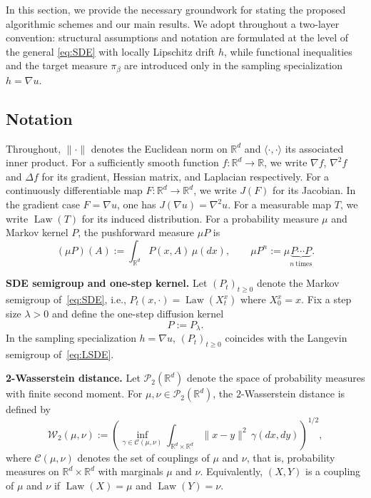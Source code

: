 \documentclass[11pt,a4paper,reqno]{amsart}
\theoremstyle{plain}
\theoremstyle{definition}
\theoremstyle{remark}
\newcommand{\R}{\mathbb{R}}
\newcommand{\W}{\mathcal{W}_2}
\DeclareMathOperator{\Law}{Law}
\begin{document}
In this section, we provide the necessary groundwork for stating the proposed algorithmic
schemes and our main results. We adopt throughout a two-layer convention: structural assumptions and notation are formulated at the level of the general \eqref{eq:SDE} with locally Lipschitz drift $h$, while functional inequalities and the target measure $\pi_\beta$ are introduced only in the sampling specialization $h = \nabla u$.

\subsection{Notation}
\label{subsec:math-prelims}

Throughout, $\|\cdot\|$ denotes the Euclidean norm on $\mathbb{R}^d$ and 
$\langle\cdot,\cdot\rangle$ its associated inner product. For a sufficiently smooth function $f:\R^d\to\R$, we write $\nabla f$, $\nabla^2 f$ and $\Delta f$
for its gradient, Hessian matrix, and Laplacian respectively. For a continuously differentiable map $F : \R^d \to \R^d$, we write $J(F)$ for its Jacobian. In the gradient case $F = \nabla u$, one has $J(\nabla u) = \nabla^2 u$.
For a measurable map $T$, we write $\Law(T)$ for its induced distribution.
For a probability measure $\mu$ and Markov kernel $P$, the pushforward measure $\mu P$ is
\[
  (\mu P)(A) := \int_{\mathbb{R}^d} P(x,A)\,\mu(dx),
  \qquad 
  \mu P^n := \mu \underbrace{P\cdots P}_{n\ \text{times}}.
\]

\medskip
\noindent\textbf{SDE semigroup and one-step kernel.}
Let $(P_t)_{t\ge 0}$ denote the Markov semigroup of~\eqref{eq:SDE}, i.e.,
$P_t(x,\cdot)=\Law(X_t^x)$ where $X_0^x=x$.
Fix a step size $\lambda>0$ and define the one-step diffusion kernel
\[
  P := P_\lambda.
\]
In the sampling specialization $h = \nabla u$, $(P_t)_{t\ge 0}$ coincides with the Langevin semigroup of~\eqref{eq:LSDE}.

\medskip
\noindent\textbf{2-Wasserstein distance.}
Let $\mathcal{P}_2(\R^d)$ denote the space of probability measures with finite second moment.
For $\mu,\nu\in\mathcal{P}_2(\R^d)$, the $2$-Wasserstein distance is defined by
\begin{equation}\label{eq:w2}
  \W(\mu,\nu)
  :=
  \left(
    \inf_{\gamma\in\mathcal{C}(\mu,\nu)}
    \int_{\R^d\times\R^d} \|x-y\|^2\,\gamma(dx,dy)
  \right)^{1/2},
\end{equation}
where $\mathcal{C}(\mu,\nu)$ denotes the set of couplings of $\mu$ and $\nu$, that is, probability measures on $\R^d\times\R^d$ with marginals $\mu$ and $\nu$. Equivalently, $(X,Y)$ is a coupling of $\mu$ and $\nu$ if $\Law(X)=\mu$ and $\Law(Y)=\nu$.
\end{document}
